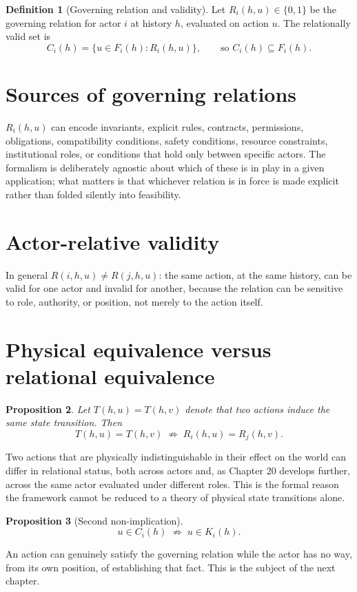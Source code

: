 \documentclass[11pt]{report}
\theoremstyle{definition}
\newtheorem{definition}{Definition}[chapter]
\theoremstyle{plain}
\newtheorem{proposition}[definition]{Proposition}
\begin{document}
\begin{definition}[Governing relation and validity]
Let $R_i(h,u) \in \{0,1\}$ be the governing relation for actor $i$ at history $h$, evaluated on action $u$. The relationally valid set is
\[
C_i(h) = \{u \in F_i(h) : R_i(h,u)\}, \qquad\text{so } C_i(h) \subseteq F_i(h).
\]
\end{definition}

\section{Sources of governing relations}
$R_i(h,u)$ can encode invariants, explicit rules, contracts, permissions, obligations, compatibility conditions, safety conditions, resource constraints, institutional roles, or conditions that hold only between specific actors. The formalism is deliberately agnostic about which of these is in play in a given application; what matters is that whichever relation is in force is made explicit rather than folded silently into feasibility.

\section{Actor-relative validity}
In general $R(i,h,u) \neq R(j,h,u)$: the same action, at the same history, can be valid for one actor and invalid for another, because the relation can be sensitive to role, authority, or position, not merely to the action itself.

\section{Physical equivalence versus relational equivalence}
\begin{proposition}
Let $T(h,u) = T(h,v)$ denote that two actions induce the same state transition. Then
\[
T(h,u) = T(h,v) \;\not\Rightarrow\; R_i(h,u) = R_j(h,v).
\]
\end{proposition}
Two actions that are physically indistinguishable in their effect on the world can differ in relational status, both across actors and, as Chapter 20 develops further, across the same actor evaluated under different roles. This is the formal reason the framework cannot be reduced to a theory of physical state transitions alone.

\begin{proposition}[Second non-implication]
\[
u \in C_i(h) \;\not\Rightarrow\; u \in K_i(h).
\]
\end{proposition}
An action can genuinely satisfy the governing relation while the actor has no way, from its own position, of establishing that fact. This is the subject of the next chapter.
\end{document}
